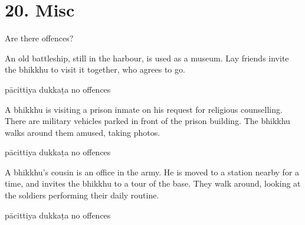 \chapter{20. Misc}
\renewcommand*{\theChapterTitle}{20. Misc}

\begin{exam}{\autoExamName}

  \begin{problem*}

    Are there offences?

    \begin{parts}

      \item An old battleship, still in the harbour, is used as a museum. Lay
      friends invite the bhikkhu to visit it together, who agrees to go.

      \bigskip

      \begin{answers}{3}
        \bChoices
         pācittiya\eAns
         dukkaṭa\eAns
         no offences\eAns
        \eChoices
      \end{answers}

      \bigskip

      \item A bhikkhu is visiting a prison inmate on his request for religious
      counselling. There are military vehicles parked in front of the prison
      building. The bhikkhu walks around them amused, taking photos.

      \bigskip

      \begin{answers}{3}
        \bChoices
         pācittiya\eAns
         dukkaṭa\eAns
         no offences\eAns
        \eChoices
      \end{answers}

      \bigskip

      \item A bhikkhu's cousin is an office in the army. He is moved to a
      station nearby for a time, and invites the bhikkhu to a tour of the base.
      They walk around, looking at the soldiers performing their daily routine.

      \bigskip

      \begin{answers}{3}
        \bChoices
         pācittiya\eAns
         dukkaṭa\eAns
         no offences\eAns
        \eChoices
      \end{answers}


\end{parts}
\end{problem*}
\end{exam}
